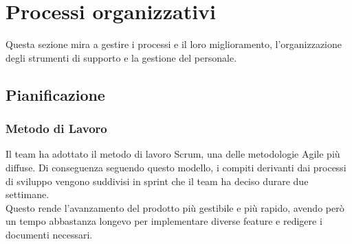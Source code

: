 \section{Processi organizzativi}
Questa sezione mira a gestire i processi e il loro miglioramento, l'organizzazione degli strumenti
di supporto e la gestione del personale.

    \subsection{Pianificazione}
        \subsubsection{Metodo di Lavoro}
        Il team ha adottato il metodo di lavoro Scrum, una delle metodologie Agile più diffuse.
        Di conseguenza seguendo questo modello, i compiti derivanti dai processi di sviluppo vengono suddivisi in sprint che il team ha deciso
        durare due settimane.\\
        Questo rende l'avanzamento del prodotto più gestibile e più rapido, avendo però un tempo abbastanza longevo per implementare diverse
        feature e redigere i documenti necessari.
